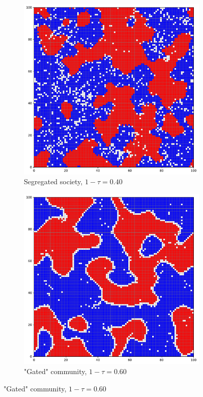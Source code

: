 \documentclass[../main.tex]{subfiles}
\begin{document}
\begin{figure}[H]
\begin{subfigure}{0.45\textwidth}
	\end{subfigure}	
	\begin{subfigure}{0.45\textwidth}	
	\centering
     \caption{Segregated society, $1-\tau = 0.40$}
	\includegraphics[width=\textwidth]{figs/schelling_model_0.4.pdf}	
	\end{subfigure}
    \begin{subfigure}{0.45\textwidth}	
	\centering
     \caption{"Gated" community, $1-\tau = 0.60$}
	\includegraphics[width=\textwidth]{figs/schelling_model_0.6.pdf}	
	\end{subfigure}
\end{figure}
\end{document}
